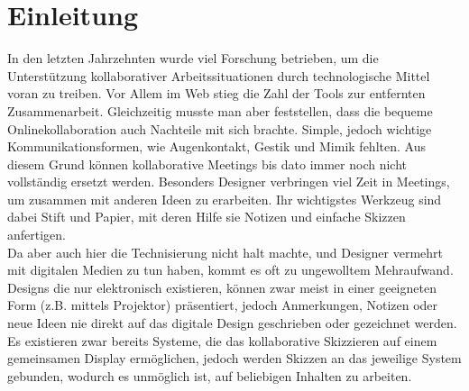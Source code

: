 \cleardoublepage
{} %

\hfill

\vfill

\begingroup
\let\cleardoublepage\relax
\chapter*{Einleitung} \label{app:introduction}
In den letzten Jahrzehnten wurde viel Forschung betrieben, um die Unterstützung kollaborativer Arbeitssituationen durch technologische Mittel voran zu treiben. Vor Allem im Web stieg die Zahl der Tools zur entfernten Zusammenarbeit. Gleichzeitig musste man aber feststellen, dass die bequeme Onlinekollaboration auch Nachteile mit sich brachte. Simple, jedoch wichtige Kommunikationsformen, wie Augenkontakt, Gestik und Mimik fehlten. Aus diesem Grund können kollaborative Meetings bis dato immer noch nicht vollständig ersetzt werden. Besonders Designer verbringen viel Zeit in Meetings, um zusammen mit anderen Ideen zu erarbeiten. Ihr wichtigstes Werkzeug sind dabei Stift und Papier, mit deren Hilfe sie Notizen und einfache Skizzen anfertigen.\\
Da aber auch hier die Technisierung nicht halt machte, und Designer vermehrt mit digitalen Medien zu tun haben, kommt es oft zu ungewolltem Mehraufwand. Designs die nur elektronisch existieren, können zwar meist in einer geeigneten Form (z.B. mittels Projektor) präsentiert, jedoch Anmerkungen, Notizen oder neue Ideen nie direkt auf das digitale Design geschrieben oder gezeichnet werden. \\
Es existieren zwar bereits Systeme, die das kollaborative Skizzieren auf einem gemeinsamen Display ermöglichen, jedoch werden Skizzen an das jeweilige System gebunden, wodurch es unmöglich ist, auf beliebigen Inhalten zu arbeiten.

